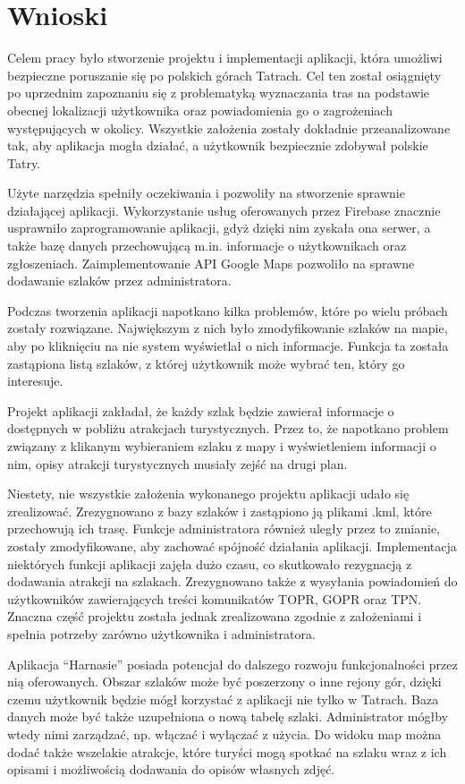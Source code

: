\section{Wnioski} \label{wnioski}
Celem pracy było stworzenie projektu i implementacji aplikacji, która umożliwi bezpieczne poruszanie się po polskich górach Tatrach. Cel ten został osiągnięty po uprzednim zapoznaniu się z problematyką wyznaczania tras na podstawie obecnej lokalizacji użytkownika oraz powiadomienia go o zagrożeniach występujących w okolicy. Wszystkie założenia zostały dokładnie przeanalizowane tak, aby aplikacja mogła działać, a użytkownik bezpiecznie zdobywał polskie Tatry.

Użyte narzędzia spełniły oczekiwania i pozwoliły na stworzenie sprawnie działającej aplikacji. Wykorzystanie usług oferowanych przez Firebase znacznie usprawniło zaprogramowanie aplikacji, gdyż dzięki nim zyskała ona serwer, a także bazę danych przechowującą m.in. informacje o użytkownikach oraz zgłoszeniach. Zaimplementowanie API Google Maps pozwoliło na sprawne dodawanie szlaków przez administratora.

Podczas tworzenia aplikacji napotkano kilka problemów, które po wielu próbach zostały rozwiązane. Największym z nich było zmodyfikowanie szlaków na mapie, aby po kliknięciu na nie system wyświetlał o nich informacje. Funkcja ta została zastąpiona listą szlaków, z której użytkownik może wybrać ten, który go interesuje.

Projekt aplikacji zakładał, że każdy szlak będzie zawierał informacje o dostępnych w pobliżu atrakcjach turystycznych. Przez to, że napotkano problem związany z klikanym wybieraniem szlaku z mapy i wyświetleniem informacji o nim, opisy atrakcji turystycznych musiały zejść na drugi plan.

Niestety, nie wszystkie założenia wykonanego projektu aplikacji udało się zrealizować. Zrezygnowano z bazy szlaków i zastąpiono ją plikami .kml, które przechowują ich trasę. Funkcje administratora również uległy przez to zmianie, zostały zmodyfikowane, aby zachować spójność działania aplikacji. Implementacja niektórych funkcji aplikacji zajęła dużo czasu, co skutkowało rezygnacją z dodawania atrakcji na szlakach. Zrezygnowano także z wysyłania powiadomień do użytkowników zawierających treści komunikatów TOPR, GOPR oraz TPN. Znaczna część projektu została jednak zrealizowana zgodnie z założeniami i spełnia potrzeby zarówno użytkownika i administratora.

Aplikacja “Harnasie” posiada potencjał do dalszego rozwoju funkcjonalności przez nią oferowanych. Obszar szlaków może być poszerzony o inne rejony gór, dzięki czemu użytkownik będzie mógł korzystać z aplikacji nie tylko w Tatrach. Baza danych może być także uzupełniona o nową tabelę szlaki. Administrator mógłby wtedy nimi zarządzać, np. włączać i wyłączać z użycia. Do widoku map można dodać także wszelakie atrakcje, które turyści mogą spotkać na szlaku wraz z ich opisami i możliwością dodawania do opisów własnych zdjęć.

